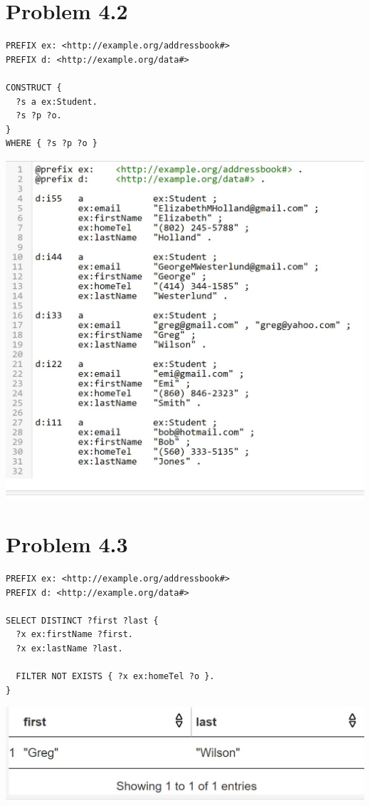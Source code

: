 \documentclass{article}
\newenvironment{problem}[1]{
  \nobreak\section*{Problem #1}
}{}
\begin{document}
  \pagebreak
  \begin{problem}{4.2}
    \begin{verbatim}
PREFIX ex: <http://example.org/addressbook#>
PREFIX d: <http://example.org/data#>

CONSTRUCT { 
  ?s a ex:Student.
  ?s ?p ?o.
}
WHERE { ?s ?p ?o }
    \end{verbatim}
    \includegraphics{images/11.jpg}
  \end{problem}

  \begin{problem}{4.3}
    \begin{verbatim}
PREFIX ex: <http://example.org/addressbook#>
PREFIX d: <http://example.org/data#>

SELECT DISTINCT ?first ?last { 
  ?x ex:firstName ?first.
  ?x ex:lastName ?last.
  
  FILTER NOT EXISTS { ?x ex:homeTel ?o }.
}
    \end{verbatim}

    \includegraphics{images/12.jpg}
  \end{problem}
\end{document}
